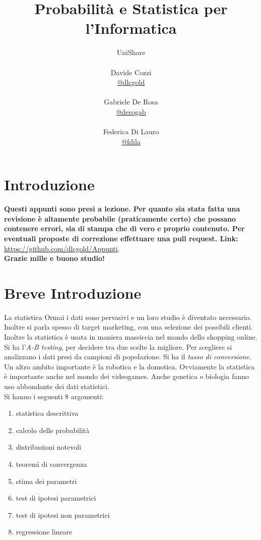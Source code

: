 \documentclass[a4paper,12pt, oneside]{book}
\title{Probabilità e Statistica per l'Informatica}
\author{UniShare\\\\Davide Cozzi\\\href{https://t.me/dlcgold}{@dlcgold}\\\\Gabriele De Rosa\\\href{https://t.me/derogab}{@derogab} \\\\Federica Di Lauro\\\href{https://t.me/f_dila}{@f\textunderscore dila}}
\date{}
\begin{document}
\maketitle


\newtheorem{teorema}{Teorema}
\newtheorem{definizione}{Definizione}
\newtheorem{esempio}{Esempio}
\newtheorem{corollario}{Corollario}
\newtheorem{lemma}{Lemma}
\newtheorem{osservazione}{Osservazione}
\newtheorem{nota}{Nota}
\newtheorem{esercizio}{Esercizio}
\tableofcontents
\renewcommand{\chaptermark}[1]{%
\markboth{\chaptername
\ \thechapter.\ #1}{}}
\renewcommand{\sectionmark}[1]{\markright{\thesection.\ #1}}
\chapter{Introduzione}
\textbf{Questi appunti sono presi a lezione. Per quanto sia stata fatta una revisione è altamente probabile (praticamente certo) che possano contenere errori, sia di stampa che di vero e proprio contenuto. Per eventuali proposte di correzione effettuare una pull request. Link: } \url{https://github.com/dlcgold/Appunti}.\\
\textbf{Grazie mille e buono studio!}
\chapter{Breve Introduzione}
La statistica 
Ormai i dati sono pervasivi e un loro studio è diventato necessario. Inoltre si parla spesso di target marketing, con una selezione dei possibili clienti. Inoltre la statistica è usata in maniera massiccia nel mondo dello shopping online. Si ha l'\textit{A-B testing}, per decidere tra due scelte la migliore. Per scegliere si analizzano i dati presi da campioni di popolazione. Si ha il \textit{tasso di conversione}. Un altro ambito importante è la robotica e la domotica. Ovviamente la statistica è importante anche nel mondo dei videogames. Anche genetica e biologia fanno uso abbondante dei dati statistici. \\
Si hanno i seguenti 8 argomenti:
\begin{enumerate}
\item statistica descrittiva
\item calcolo delle probabilità
\item distribuzioni notevoli
\item teoremi di convergenza
\item stima dei parametri
\item test di ipotesi parametrici
\item test di ipotesi non parametrici
\item regressione lineare
\end{enumerate}
\end{document}
